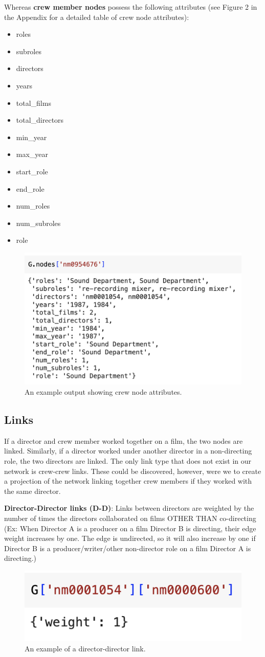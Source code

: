 \documentclass[12pt]{article}
\begin{document}
Whereas \textbf{crew member nodes }possess the following attributes (see Figure 2 in the Appendix for a detailed table of crew node attributes):
\begin{itemize}[itemsep=-5pt]
    \item roles
    \item subroles
    \item directors
    \item years
    \item total\_films
    \item total\_directors
    \item min\_year
    \item max\_year
    \item start\_role
    \item end\_role
    \item num\_roles
    \item num\_subroles
    \item role

\end{itemize}
\begin{figure}[h!]
    \centering
    \includegraphics[width=0.5\linewidth]{crew_node.png}
    \caption{An example output showing crew node attributes.}
    \label{fig:crew-node}
\end{figure}

\subsection*{Links}
If a director and crew member worked together on a film, the two nodes are linked. Similarly, if a director worked under another director in a non-directing role, the two directors are linked. The only link type that does not exist in our network is crew-crew links. These could be discovered, however, were we to create a projection of the network linking together crew members if they worked with the same director.

\textbf{Director-Director links (D-D)}: Links between directors are weighted by the number of times the directors collaborated on films OTHER THAN co-directing (Ex: When Director A is a producer on a film Director B is directing, their edge weight increases by one. The edge is undirected, so it will also increase by one if Director B is a producer/writer/other non-director role on a film Director A is directing.) 
\begin{figure}[h!]
    \centering
    \includegraphics[width=0.25\linewidth]{DD_link.png}
    \caption{An example of a director-director link.}
    \label{fig:dd_link}
\end{figure}
\end{document}
